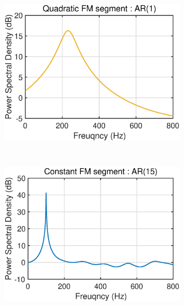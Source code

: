 \begin{figure}[htb]
     \begin{subfigure}[b]{0.32\textwidth}
         \centering
         \includegraphics[width=\textwidth]{fig/32/32a7.eps}
     \end{subfigure}
     \\
     \hspace{-0.4cm}
     \begin{subfigure}[b]{0.32\textwidth}
         \centering
         \includegraphics[width=\textwidth]{fig/32/32a8.eps}
     \end{subfigure}
    \hspace{-0.4cm}
     \begin{subfigure}[b]{0.32\textwidth}
         \centering

\end{subfigure}
\end{figure}
